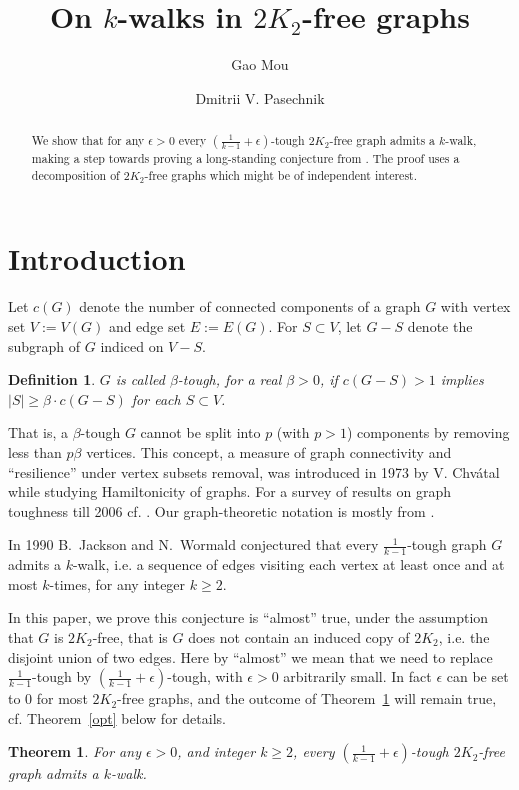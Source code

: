 \documentclass{amsart}
\newtheorem{theorem}{Theorem}
\newtheorem{definition}{Definition}
\newcommand{\ncc}{c}
\begin{document}
\author{Gao Mou}
\address{School of Physical and Mathematical Sciences, Nanyang Technological University, Singapore} 
\author{Dmitrii V. Pasechnik}
\address{Department of Computer Science, The University of Oxford, UK}

\title{On $k$-walks in $2K_2$-free graphs}
\begin{abstract}
We show that for any $\epsilon>0$ every $(\frac{1}{k-1}+\epsilon)$-tough
$2K_2$-free graph admits a $k$-walk, making a step towards proving a
long-standing conjecture from \cite{jackson1990k}. The proof uses a
decomposition of $2K_2$-free graphs which might be of independent interest.
\end{abstract}

\maketitle

\section{Introduction}

Let  $\ncc(G)$ denote the number of connected components of a graph $G$ with vertex set $V:=V(G)$ and edge set $E:=E(G)$. For $S\subset V$, let $G-S$ denote the subgraph of $G$ indiced on $V-S$.
\begin{definition}
$G$ is called $\beta$-{\em tough},
for a real $\beta>0$, if $\ncc(G-S)>1$ implies $|S|\ge \beta\cdot \ncc(G-S)$ 
for each $S\subset V$.
\end{definition}
That is, a $\beta$-tough 
$G$ cannot be split into $p$ (with $p>1$) components by removing less than
$p\beta$ vertices.  
This concept, a measure of graph connectivity and ``resilience'' under vertex subsets removal,
was introduced in 1973 by V. Chv\'{a}tal 
while studying   Hamiltonicity of graphs. For a survey of results on graph toughness till 2006
cf. \cite{MR2221006}. Our graph-theoretic notation is mostly from \cite{bomu08}.

In 1990 B.~Jackson and N.~Wormald conjectured \cite{jackson1990k} that every
$\frac{1}{k-1}$-tough graph $G$ admits a $k$-walk, i.e. a sequence of edges
visiting each vertex at least once and at most $k$-times, for any integer $k\ge2$. 

In this paper, we prove this conjecture is ``almost'' true, under the assumption that $G$ is  
$2K_2$-free, 
that is $G$ does not contain an induced copy of $2K_2$, i.e. the disjoint union of two edges.
Here by ``almost'' we mean that we need to replace
$\frac{1}{k-1}$-tough by $(\frac{1}{k-1}+\epsilon)$-tough, with $\epsilon>0$
arbitrarily small.
In fact $\epsilon$ can be set to 0 for most $2K_2$-free graphs, and the outcome of Theorem~\ref{thm2}
will remain true, cf. Theorem~\ref{opt} below for details.
\begin{theorem}\label{thm2}
For any $\epsilon>0$, and integer $k\ge2$,
every $(\frac{1}{k-1}+\epsilon)$-tough $2K_2$-free graph admits a $k$-walk. 
\end{theorem}
\end{document}
